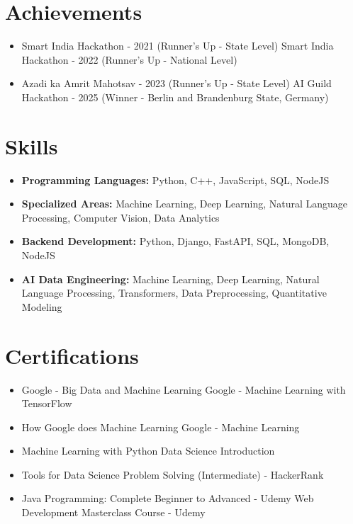 \documentclass[a4paper,10pt]{article}
\begin{document}
\section*{Achievements}
\begin{itemize}
\item Smart India Hackathon - 2021 (Runner's Up - State Level) \hfill Smart India Hackathon - 2022 (Runner's Up - National Level)
\item Azadi ka Amrit Mahotsav - 2023 (Runner's Up - State Level) \hfill AI Guild Hackathon - 2025 (Winner - Berlin and Brandenburg State, Germany)
\end{itemize}

\section*{Skills}
\begin{itemize}
  \item \textbf{Programming Languages:} Python, C++, JavaScript, SQL, NodeJS
  \item \textbf{Specialized Areas:} Machine Learning, Deep Learning, Natural Language Processing, Computer Vision, Data Analytics
  \item \textbf{Backend Development:} Python, Django, FastAPI, SQL, MongoDB, NodeJS
  \item \textbf{AI Data Engineering:} Machine Learning, Deep Learning, Natural Language Processing, Transformers, Data Preprocessing, Quantitative Modeling
\end{itemize}

\section*{Certifications}
\begin{itemize}
\item Google - Big Data and Machine Learning \hfill Google - Machine Learning with TensorFlow
\item How Google does Machine Learning \hfill Google - Machine Learning
\item Machine Learning with Python \hfill Data Science Introduction
\item Tools for Data Science \hfill Problem Solving (Intermediate) - HackerRank
\item Java Programming: Complete Beginner to Advanced - Udemy \hfill Web Development Masterclass Course - Udemy
\end{itemize}
\end{document}
